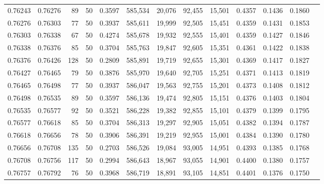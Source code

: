 \begin{tabular}{rrrrrrrrrrrrr}
0.76243 & 0.76276 &    89 &  50 &                                     0.3597 & 585,534 &  20,076 &  92,455 &  15,501 & 0.4357 & 0.1436 & 0.1860 \\
0.76276 & 0.76303 &    77 &  50 &                                     0.3937 & 585,611 &  19,999 &  92,505 &  15,451 & 0.4359 & 0.1431 & 0.1853 \\
0.76303 & 0.76338 &    67 &  50 &                                     0.4274 & 585,678 &  19,932 &  92,555 &  15,401 & 0.4359 & 0.1427 & 0.1846 \\
0.76338 & 0.76376 &    85 &  50 &                                     0.3704 & 585,763 &  19,847 &  92,605 &  15,351 & 0.4361 & 0.1422 & 0.1838 \\
0.76376 & 0.76426 &   128 &  50 &                                     0.2809 & 585,891 &  19,719 &  92,655 &  15,301 & 0.4369 & 0.1417 & 0.1827 \\
0.76427 & 0.76465 &    79 &  50 &                                     0.3876 & 585,970 &  19,640 &  92,705 &  15,251 & 0.4371 & 0.1413 & 0.1819 \\
0.76465 & 0.76498 &    77 &  50 &                                     0.3937 & 586,047 &  19,563 &  92,755 &  15,201 & 0.4373 & 0.1408 & 0.1812 \\
0.76498 & 0.76535 &    89 &  50 &                                     0.3597 & 586,136 &  19,474 &  92,805 &  15,151 & 0.4376 & 0.1403 & 0.1804 \\
0.76535 & 0.76577 &    92 &  50 &                                     0.3521 & 586,228 &  19,382 &  92,855 &  15,101 & 0.4379 & 0.1399 & 0.1795 \\
0.76577 & 0.76618 &    85 &  50 &                                     0.3704 & 586,313 &  19,297 &  92,905 &  15,051 & 0.4382 & 0.1394 & 0.1787 \\
0.76618 & 0.76656 &    78 &  50 &                                     0.3906 & 586,391 &  19,219 &  92,955 &  15,001 & 0.4384 & 0.1390 & 0.1780 \\
0.76656 & 0.76708 &   135 &  50 &                                     0.2703 & 586,526 &  19,084 &  93,005 &  14,951 & 0.4393 & 0.1385 & 0.1768 \\
0.76708 & 0.76756 &   117 &  50 &                                     0.2994 & 586,643 &  18,967 &  93,055 &  14,901 & 0.4400 & 0.1380 & 0.1757 \\
0.76757 & 0.76792 &    76 &  50 &                                     0.3968 & 586,719 &  18,891 &  93,105 &  14,851 & 0.4401 & 0.1376 & 0.1750 \\

\end{tabular}
